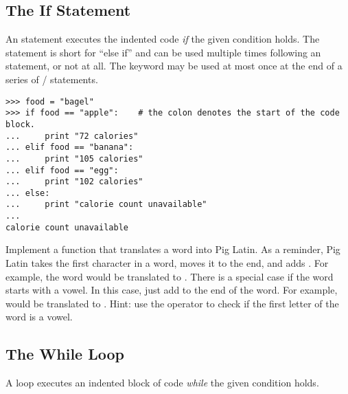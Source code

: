 
\subsection*{The If Statement}
An  statement executes the 
indented code \emph{if} the given condition holds.
The  statement is short for ``else if'' and can be used multiple times following an  statement, or not at all. 
The  keyword may be used at most once at the end of a series of / statements.
\begin{lstlisting}
>>> food = "bagel"         
>>> if food == "apple":    # the colon denotes the start of the code block.
...     print "72 calories"
... elif food == "banana":
...     print "105 calories"
... elif food == "egg":
...     print "102 calories"
... else: 
...     print "calorie count unavailable"
...     
calorie count unavailable
\end{lstlisting}

\begin{problem}
Implement a function that translates a word into Pig Latin.  As a reminder, Pig Latin takes the first character in a word, moves it to the end, and adds .  For example, the word  would be translated to .  There is a special case if the word starts with a vowel.  In this case, just add  to the end of the word.  For example,  would be translated to .  Hint: use the  operator to check if the first letter of the word is a vowel.
\end{problem}

\subsection*{The While Loop}
A  loop executes an indented block of code \emph{while} the given condition holds. 

